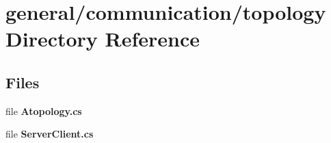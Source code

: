 \section{general/communication/topology Directory Reference}
\label{dir_de327f73201ab1d87cc607fe5bbff19a}
\subsection*{Files}
\begin{DoxyCompactItemize}
\item 
file {\bf Atopology.\-cs}
\item 
file {\bf Server\-Client.\-cs}
\end{DoxyCompactItemize}
